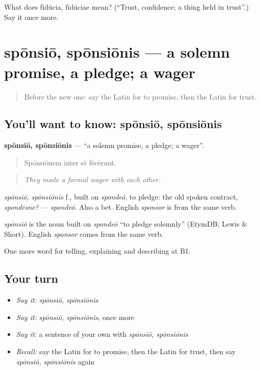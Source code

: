 \begin{tcolorbox}[breakable,colback=teal!4,colframe=teal!35!black,title={Before you move on}]
What does fīdūcia, fīdūciae mean? (\textquotedblleft{}Trust, confidence; a thing held in trust\textquotedblright{}.) Say it once more.
\end{tcolorbox}
\section[spōnsiō, spōnsiōnis]{spōnsiō, spōnsiōnis — a solemn promise, a pledge; a wager}

\label{lesson:LA-C396-sponsio}



\begin{quote}
Before the new one: say the Latin for to promise, then the Latin for trust.
\end{quote}

\subsection*{You'll want to know: spōnsiō, spōnsiōnis}
\textbf{spōnsiō, spōnsiōnis} — \textquotedblleft{}a solemn promise, a pledge; a wager\textquotedblright{}.

\begin{quote}
Spōnsiōnem inter sē fēcērunt.
\end{quote}

\begin{quote}
\emph{They made a formal wager with each other.}
\end{quote}

\emph{spōnsiō, spōnsiōnis} f., built on \emph{spondeō}, to pledge: the old spoken contract, \emph{spondēsne?} — \emph{spondeō}. Also a bet. English \emph{sponsor} is from the same verb.

\begin{cousinweb}
\emph{spōnsiō} is the noun built on \emph{spondeō} \textquotedblleft{}to pledge solemnly\textquotedblright{} (EtymDB; Lewis \& Short). English \emph{sponsor} comes from the same verb.
\end{cousinweb}

\begin{grammarlens}[title={What you've built}]
One more word for telling, explaining and describing at B1.
\end{grammarlens}

\subsection*{Your turn}
\begin{itemize}
\raggedright
  \item \emph{Say it:} \emph{spōnsiō, spōnsiōnis}
  \item \emph{Say it:} \emph{spōnsiō, spōnsiōnis}, once more
  \item \emph{Say it:} a sentence of your own with \emph{spōnsiō, spōnsiōnis}
  \item \emph{Recall:} say the Latin for to promise, then the Latin for trust, then say \emph{spōnsiō, spōnsiōnis} again
\end{itemize}

